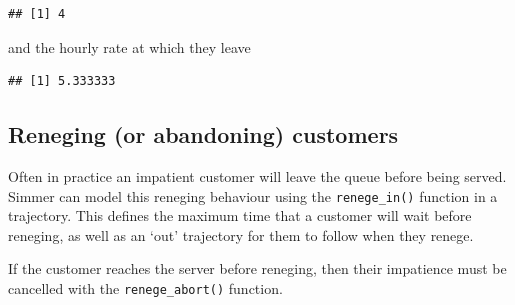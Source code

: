\documentclass[
]{book}
\newenvironment{Shaded}{\begin{snugshade}}{\end{snugshade}}
\newcommand{\DecValTok}[1]{\textcolor[rgb]{0.00,0.00,0.81}{#1}}
\newcommand{\FunctionTok}[1]{\textcolor[rgb]{0.00,0.00,0.00}{#1}}
\newcommand{\NormalTok}[1]{#1}
\newcommand{\SpecialCharTok}[1]{\textcolor[rgb]{0.00,0.00,0.00}{#1}}
\begin{document}
\begin{verbatim}
## [1] 4
\end{verbatim}

and the hourly rate at which they leave

\begin{Shaded}
\end{Shaded}

\begin{verbatim}
## [1] 5.333333
\end{verbatim}

\hypertarget{reneging-or-abandoning-customers}{%
\subsection{Reneging (or abandoning) customers}\label{reneging-or-abandoning-customers}}

Often in practice an impatient customer will leave the queue before being served. Simmer can model this reneging behaviour using the \texttt{renege\_in()} function in a trajectory. This defines the maximum time that a customer will wait before reneging, as well as an `out' trajectory for them to follow when they renege.

If the customer reaches the server before reneging, then their impatience must be cancelled with the \texttt{renege\_abort()} function.
\end{document}
